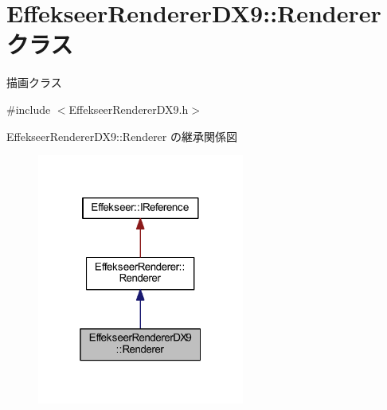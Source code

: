 \hypertarget{class_effekseer_renderer_d_x9_1_1_renderer}{}\section{Effekseer\+Renderer\+D\+X9\+:\+:Renderer クラス}
\label{class_effekseer_renderer_d_x9_1_1_renderer}


描画クラス  




{\ttfamily \#include $<$Effekseer\+Renderer\+D\+X9.\+h$>$}



Effekseer\+Renderer\+D\+X9\+:\+:Renderer の継承関係図\nopagebreak
\begin{figure}[H]
\begin{center}
\leavevmode
\includegraphics[width=193pt]{class_effekseer_renderer_d_x9_1_1_renderer__inherit__graph}
\end{center}
\end{figure}
